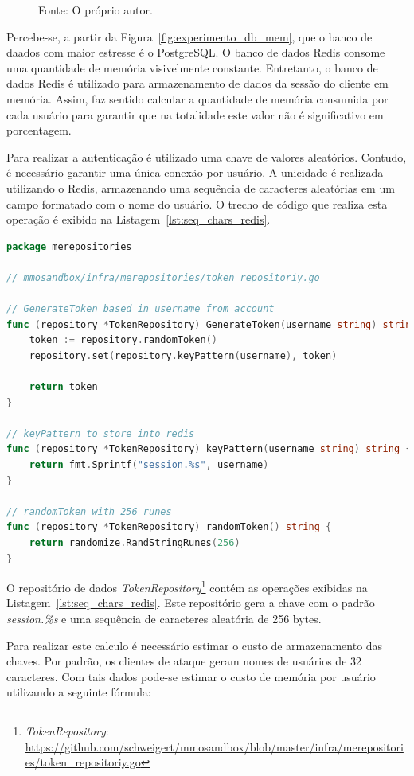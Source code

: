 \begin{figure}[htb!]
    Fonte: O próprio autor.
\end{figure}

Percebe-se, a partir da Figura~\ref{fig:experimento_db_mem}, que o banco de daados com maior estresse é o PostgreSQL.
%
O banco de dados Redis consome uma quantidade de memória visivelmente constante.
%
Entretanto, o banco de dados Redis é utilizado para armazenamento de dados da sessão do cliente em memória.
%
Assim, faz sentido calcular a quantidade de memória consumida por cada usuário para garantir que na totalidade este valor não é significativo em porcentagem.

Para realizar a autenticação é utilizado uma chave de valores aleatórios.
%
Contudo, é necessário garantir uma única conexão por usuário.
%
A unicidade é realizada utilizando o Redis, armazenando uma sequência de caracteres aleatórias em um campo formatado com o nome do usuário.
%
O trecho de código que realiza esta operação é exibido na Listagem~\ref{lst:seq_chars_redis}.



\begin{lstlisting}[language=go,firstnumber=1, caption={Informações do Bloco},label={lst:seq_chars_redis}]
package merepositories

// mmosandbox/infra/merepositories/token_repositoriy.go

// GenerateToken based in username from account
func (repository *TokenRepository) GenerateToken(username string) string {
    token := repository.randomToken()
    repository.set(repository.keyPattern(username), token)

    return token
}

// keyPattern to store into redis
func (repository *TokenRepository) keyPattern(username string) string {
    return fmt.Sprintf("session.%s", username)
}

// randomToken with 256 runes
func (repository *TokenRepository) randomToken() string {
    return randomize.RandStringRunes(256)
}
\end{lstlisting}

O repositório de dados \textit{TokenRepository}\footnote{\textit{TokenRepository}: \url{https://github.com/schweigert/mmosandbox/blob/master/infra/merepositories/token_repositoriy.go}} contém as operações exibidas na Listagem~\ref{lst:seq_chars_redis}.
%
Este repositório gera a chave com o padrão \textit{session.\%s} e uma sequência de caracteres aleatória de 256 bytes.

Para realizar este calculo é necessário estimar o custo de armazenamento das chaves.
%
Por padrão, os clientes de ataque geram nomes de usuários de 32 caracteres.
%
Com tais dados pode-se estimar o custo de memória por usuário utilizando a seguinte fórmula:

